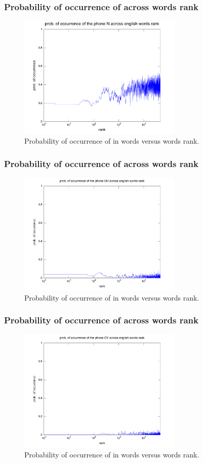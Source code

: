 \documentclass{beamer}
\begin{document}
\frame
{
  \frametitle{Probability of occurrence of \textipa{[n]} across words rank}
\begin{figure}[h!]
\centering
\includegraphics[width=0.7\textwidth]{images/proboccwordsphone_N.pdf}
\caption{Probability of occurrence of \textipa{[n]} in words versus words rank.}
\label{fig:proboccwordsphone_N}
\end{figure} 
}


\frame
{
  \frametitle{Probability of occurrence of \textipa{[U]} across words rank}
\begin{figure}[h!]
\centering
\includegraphics[width=0.7\textwidth]{images/proboccwordsphone_UH.pdf}
\caption{Probability of occurrence of \textipa{[U]} in words versus words rank.}
\label{fig:proboccwordsphone_UH}
\end{figure} 
}


\frame
{
  \frametitle{Probability of occurrence of \textipa{[OI]} across words rank}
\begin{figure}[h!]
\centering
\includegraphics[width=0.7\textwidth]{images/proboccwordsphone_OY.pdf}
\caption{Probability of occurrence of \textipa{[OI]} in words versus words rank.}
\label{fig:proboccwordsphone_OY}
\end{figure} 
}
\end{document}
